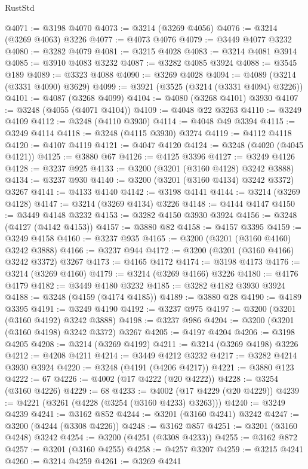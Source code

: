 \begin{lexlean}{RustStd}
\begin{coremodule}
{\begin{coremodule}
{{{{{{{{{{{{{{{{{{{{{{{{{@4071 := @3198 @4070
@4073 := @3214 (@3269 @4056)
@4076 := @3214 (@3269 @4063) @3226
@4077 := @4073 @4076
@4079 := @3449 @4077 @3232
@4080 := @3282 @4079
@4081 := @3215 @4028
@4083 := @3214 @4081 @3914
@4085 := @3910 @4083 @3232
@4087 := @3282 @4085 @3924
@4088 := @3545 @189
@4089 := @3323 @4088
@4090 := @3269 @4028
@4094 := @4089 (@3214 (@3331 @4090) @3629)
@4099 := @3921 (@3525 (@3214 (@3331 @4094) @3226))
@4101 := @4087 (@3268 @4099)
@4104 := @4080 (@3268 @4101) @3930
@4107 := @3248 (@4055 (@4071 @4104))
@4109 := @4048 @22 @3263
@4110 := @3249 @4109
@4112 := @3248 (@4110 @3930)
@4114 := @4048 @49 @3394
@4115 := @3249 @4114
@4118 := @3248 (@4115 @3930) @3274
@4119 := @4112 @4118
@4120 := @4107 @4119
@4121 := @4047 @4120
@4124 := @3248 (@4020 (@4045 @4121))
@4125 := @3880 @67
@4126 := @4125 @3396
@4127 := @3249 @4126
@4128 := @3237 @925
@4133 := @3200 (@3201 (@3160 @4128) @3242 @3888)
@4134 := @3237 @930
@4140 := @3200 (@3201 (@3160 @4134) @3242 @3372) @3267
@4141 := @4133 @4140
@4142 := @3198 @4141
@4144 := @3214 (@3269 @4128)
@4147 := @3214 (@3269 @4134) @3226
@4148 := @4144 @4147
@4150 := @3449 @4148 @3232
@4153 := @3282 @4150 @3930 @3924
@4156 := @3248 (@4127 (@4142 @4153))
@4157 := @3880 @82
@4158 := @4157 @3395
@4159 := @3249 @4158
@4160 := @3237 @935
@4165 := @3200 (@3201 (@3160 @4160) @3242 @3888)
@4166 := @3237 @944
@4172 := @3200 (@3201 (@3160 @4166) @3242 @3372) @3267
@4173 := @4165 @4172
@4174 := @3198 @4173
@4176 := @3214 (@3269 @4160)
@4179 := @3214 (@3269 @4166) @3226
@4180 := @4176 @4179
@4182 := @3449 @4180 @3232
@4185 := @3282 @4182 @3930 @3924
@4188 := @3248 (@4159 (@4174 @4185))
@4189 := @3880 @28
@4190 := @4189 @3395
@4191 := @3249 @4190
@4192 := @3237 @975
@4197 := @3200 (@3201 (@3160 @4192) @3242 @3888)
@4198 := @3237 @986
@4204 := @3200 (@3201 (@3160 @4198) @3242 @3372) @3267
@4205 := @4197 @4204
@4206 := @3198 @4205
@4208 := @3214 (@3269 @4192)
@4211 := @3214 (@3269 @4198) @3226
@4212 := @4208 @4211
@4214 := @3449 @4212 @3232
@4217 := @3282 @4214 @3930 @3924
@4220 := @3248 (@4191 (@4206 @4217))
@4221 := @3880 @123
@4222 := 67
@4226 := @4002 (@17 @4222 (@20 @4222))
@4228 := @3254 (@3160 @4226)
@4229 := 68
@4233 := @4002 (@17 @4229 (@20 @4229))
@4239 := @4221 (@3261 (@4228 (@3254 (@3160 @4233) @3263)))
@4240 := @3249 @4239
@4241 := @3162 @852
@4244 := @3201 (@3160 @4241) @3242
@4247 := @3200 (@4244 (@3308 @4226))
@4248 := @3162 @857
@4251 := @3201 (@3160 @4248) @3242
@4254 := @3200 (@4251 (@3308 @4233))
@4255 := @3162 @872
@4257 := @3201 (@3160 @4255)
@4258 := @4257 @3207
@4259 := @3215 @4241
@4260 := @3214 @4259
@4261 := @3269 @4241
}}}}}}}}}}}}}}}}}}}}}}}}}
\end{coremodule}}
\end{coremodule}
\end{lexlean}
